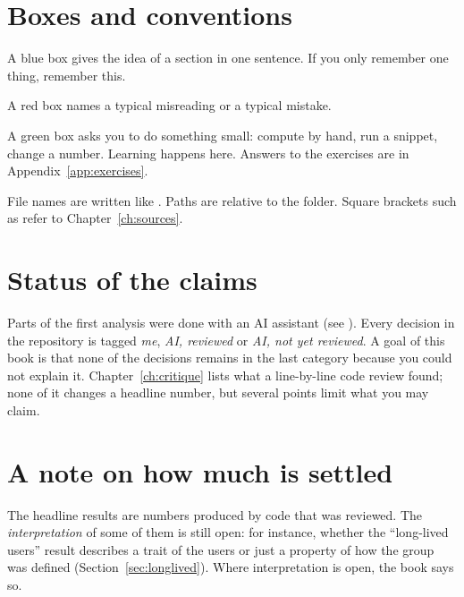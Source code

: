 \section*{Boxes and conventions}
\begin{idea}
A blue box gives the idea of a section in one sentence. If you only remember one thing, remember this.
\end{idea}
\begin{pitfall}
A red box names a typical misreading or a typical mistake.
\end{pitfall}
\begin{tryit}
A green box asks you to do something small: compute by hand, run a snippet, change a number. Learning happens here. Answers to the exercises are in Appendix~\ref{app:exercises}.
\end{tryit}

File names are written like . Paths are relative to the  folder. Square brackets such as  refer to Chapter~\ref{ch:sources}.

\section*{Status of the claims}
Parts of the first analysis were done with an AI assistant (see ). Every decision in the repository is tagged \emph{me}, \emph{AI, reviewed} or \emph{AI, not yet reviewed}. A goal of this book is that none of the decisions remains in the last category because you could not explain it. Chapter~\ref{ch:critique} lists what a line-by-line code review found; none of it changes a headline number, but several points limit what you may claim.

\section*{A note on how much is settled}
The headline results are numbers produced by code that was reviewed. The \emph{interpretation} of some of them is still open: for instance, whether the ``long-lived users'' result describes a trait of the users or just a property of how the group was defined (Section~\ref{sec:longlived}). Where interpretation is open, the book says so.
